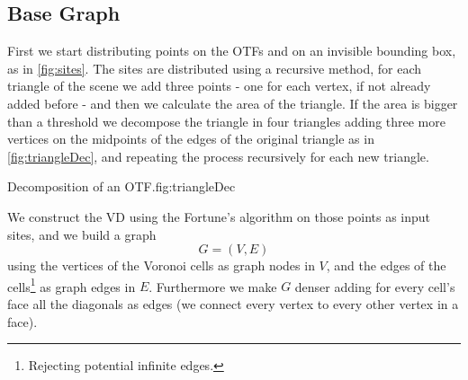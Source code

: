 \documentclass[dissertation.tex]{subfiles}
\begin{document}
\subsection{Base Graph}\label{sec:baseGraph}
First we
start distributing points on the \acp{OTF} and on
an invisible bounding box, as in \cref{fig:sites}.
The sites are distributed using a recursive method, for each triangle
of the scene we add three points - one for each
vertex, if not already added before - and then we calculate the area
of the triangle. If the area is bigger than a threshold we decompose
the triangle in four triangles adding three more vertices on the
midpoints of the edges of the original triangle as in
\cref{fig:triangleDec}, and repeating the process recursively for
each new triangle.
\begin{myfig}{Decomposition of an \ac{OTF}.}{fig:triangleDec}
\end{myfig}

We construct the \ac{VD} using the Fortune's algorithm
\cite{fortune} on
those points as input sites, and we build a graph
$$G=(V,E)$$
using the vertices
of the Voronoi cells as graph nodes in $V$, and the edges of the cells\footnote{Rejecting potential
  infinite edges.} as graph edges in $E$. Furthermore we make $G$
denser adding for every cell's face all the diagonals as edges (we
connect every vertex to every other vertex in a face).
\end{document}
